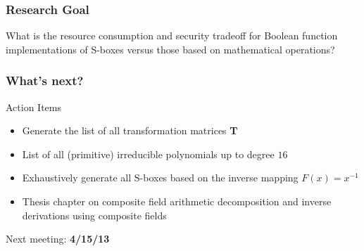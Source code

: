 \documentclass[handout]{beamer}
\begin{document}
\begin{frame}
	\frametitle{Research Goal}
	What is the resource consumption and security tradeoff for Boolean function implementations of S-boxes
	versus those based on mathematical operations?
\end{frame}

\begin{frame}
	\frametitle{What's next?}
	\begin{center}
		Action Items
	\end{center}	
	\begin{itemize}
		\item Generate the list of all transformation matrices \textbf{T}
		\item List of all (primitive) irreducible polynomials up to degree $16$
		\item Exhaustively generate all S-boxes based on the inverse mapping $F(x) = x^{-1}$
		\item Thesis chapter on composite field arithmetic decomposition and inverse derivations
		using composite fields
	\end{itemize}
	\begin{center}
		Next meeting: \textbf{4/15/13}
	\end{center}
\end{frame}
\end{document}
